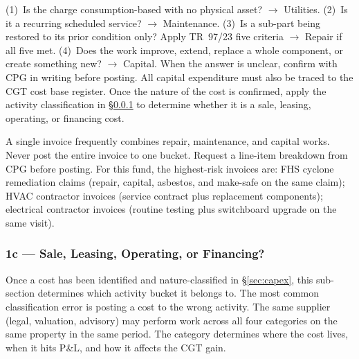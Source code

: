 \documentclass[10pt,a4paper]{article}
\begin{document}
\begin{note}
(1)~Is the charge consumption-based with no physical asset? $\to$ Utilities. (2)~Is it a recurring scheduled service? $\to$ Maintenance. (3)~Is a sub-part being restored to its prior condition only? Apply TR~97/23 five criteria $\to$ Repair if all five met. (4)~Does the work improve, extend, replace a whole component, or create something new? $\to$ Capital. When the answer is unclear, confirm with CPG in writing before posting. All capital expenditure must also be traced to the CGT cost base register. Once the nature of the cost is confirmed, apply the activity classification in \S\ref{sec:grp1c} to determine whether it is a sale, leasing, operating, or financing cost.
\end{note}

\begin{warning}
A single invoice frequently combines repair, maintenance, and capital works. Never post the entire invoice to one bucket. Request a line-item breakdown from CPG before posting. For this fund, the highest-risk invoices are: FHS cyclone remediation claims (repair, capital, asbestos, and make-safe on the same claim); HVAC contractor invoices (service contract plus replacement components); electrical contractor invoices (routine testing plus switchboard upgrade on the same visit).
\end{warning}


\subsubsection{1c --- Sale, Leasing, Operating, or Financing?}
\label{sec:grp1c}

Once a cost has been identified and nature-classified in \S\ref{sec:capex}, this sub-section determines which activity bucket it belongs to. The most common classification error is posting a cost to the wrong activity. The same supplier (legal, valuation, advisory) may perform work across all four categories on the same property in the same period. The category determines where the cost lives, when it hits P\&L, and how it affects the CGT gain.
\end{document}
